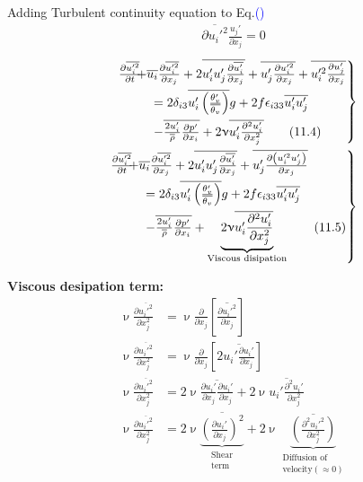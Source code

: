\documentclass[fleqn,10pt]{SelfArx} %
\newcommand{\myeqref}[1]{Eq.\textcolor{blue}{\textup{(\getrefnumber{#1})}}}
\begin{document}
Adding Turbulent continuity equation to \myeqref{eq:11.3}
\begin{align*}
	\overline{\partial u_i'^2}\frac{u_j'}{\partial x_j} = 0
\end{align*}
\begin{align*}
	\begin{rcases}
		\frac{\partial \overline{u_i'^2}}{\partial t} & \!\!\!\!\!\!\!\! + \overline{u_i}\frac{\partial \overline{u_i'^2}}{\partial x_j} + 2\overline{u_i'u_j'\frac{\partial \overline{u_i'}}{\partial x_j}} + \overline{u_j'\frac{\partial u_i'^2}{\partial x_j}} + \overline{u_i'^2\frac{\partial u_j'}{\partial x_j}} \\ &= 2\delta_{i3}\overline{u_i'\left(\frac{\theta_v'}{\overline{\theta_v}}\right)}g + 2f\epsilon_{i33}\overline{u_i'u_j'} \\ &- \overline{\frac{2u_i'}{\overline{\rho}}\frac{\partial p'}{\partial x_i}} + 2\upnu \overline{u_i'\frac{\partial^2 u_i'}{\partial x_j^2}} \tag{11.4} \label{eq:11.4}
	\end{rcases} \\
	\begin{rcases}
		\frac{\partial \overline{u_i'^2}}{\partial t} & \!\!\!\!\!\!\!\! + \overline{u_i}\frac{\partial \overline{u_i'^2}}{\partial x_j} + 2\overline{u_i'u_j'\frac{\partial \overline{u_i'}}{\partial x_j}} + \overline{u_j'\frac{\partial \left(u_i'^2 u_j'\right)}{\partial x_j}} \\ &= 2\delta_{i3}\overline{u_i'\left(\frac{\theta_v'}{\overline{\theta_v}}\right)}g + 2f\epsilon_{i33}\overline{u_i'u_j'} \\ &- \overline{\frac{2u_i'}{\overline{\rho}}\frac{\partial p'}{\partial x_i}} + \underbrace{2\upnu \overline{u_i'\frac{\partial^2 u_i'}{\partial x_j^2}}}_{\text{Viscous disipation}} \tag{11.5} \label{eq:11.5}
	\end{rcases}
\end{align*}

\textbf{Viscous desipation term:}
\begin{align*}
	\upnu\frac{\partial \overline{u_i'^2}}{\partial x_j^2} &= \upnu \frac{\partial }{\partial x_j}\left[\overline{\frac{\partial u_i'^2}{\partial x_j}}\right] \\
	\upnu\frac{\partial \overline{u_i'^2}}{\partial x_j^2} &= \upnu \frac{\partial }{\partial x_j}\left[2\overline{u_i'\frac{\partial u_i'}{\partial x_j}}\right] \\
	\upnu\frac{\partial \overline{u_i'^2}}{\partial x_j^2} &= 2\upnu \overline{\frac{\partial u_i' }{\partial x_j}\frac{\partial u_i' }{\partial x_j}} + 2\upnu \overline{u_i'\frac{\partial^2 u_i'}{\partial x_j^2}} \\
	\upnu\frac{\partial \overline{u_i'^2}}{\partial x_j^2} &= 2\upnu \underbrace{\overline{\left(\frac{\partial u_i' }{\partial x_j}\right)^2}}_{\substack{\text{Shear} \\ \text{term}}} + 2\upnu \underbrace{\overline{\left(\frac{\partial^2 u_i'^2}{\partial x_j^2}\right)}}_{\substack{\text{Diffusion of} \\ \text{velocity} (\approx 0)}} \tag{11.6} \label{eq:viscousapprox}
\end{align*}
\end{document}
